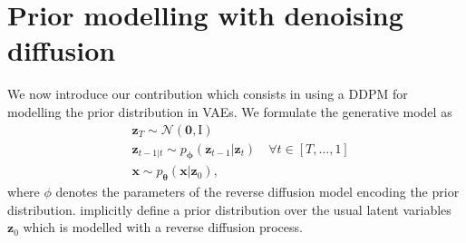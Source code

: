 \documentclass{article}
\begin{document}
\section{Prior modelling with denoising diffusion}
We now introduce our contribution which consists in using a DDPM for modelling the prior distribution in VAEs. 
We formulate the generative model as
\begin{align}
    & \mathbf{z}_T \sim \mathcal{N}(\mathbf{0}, \text{I}) \label{eq:VAE_DDPM_1} \\
    & \mathbf{z}_{t-1|t} \sim p_\mathbf{\phi}(\mathbf{z}_{t-1}|\mathbf{z}_{t})\quad \forall t \in \left[T, \dots, 1\right] \label{eq:VAE_DDPM_2} \\
    &\mathbf{x} \sim p_\mathbf{\theta}(\mathbf{x}|\mathbf{z}_0),
\end{align}
where $\phi$ denotes the parameters of the reverse diffusion model encoding the prior distribution.  implicitly define a prior distribution over the usual latent variables $\mathbf{z}_0$ which is modelled with a reverse diffusion process. 
\end{document}
